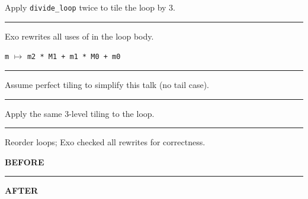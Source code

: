 {\LARGE
Apply \texttt{divide\_loop} twice to tile the  loop by 3.

}

\newpage
{}

{\large

}

\vspace{3mm}
\hrule

{\LARGE
Exo rewrites all uses of  in the loop body.

\texttt{m} $\mapsto$ \texttt{m2 * M1 + m1 * M0 + m0}

}

\newpage
{}

{\large

}

\vspace{3mm}
\hrule

{\LARGE
Assume perfect tiling to simplify this talk (no tail case).

}

\newpage
{}

{\large

}

\vspace{3mm}
\hrule

{\LARGE
Apply the same 3-level tiling to the  loop.

}

\newpage
{}

{\large

}

\vspace{3mm}
\hrule

{\LARGE
Reorder loops; Exo checked all rewrites for correctness.

}

\newpage
{\large
\textbf{\LARGE BEFORE}\\

}

\vspace{1mm}
\hrule

{\large
\textbf{\LARGE AFTER}\\

}

\newpage
{}

